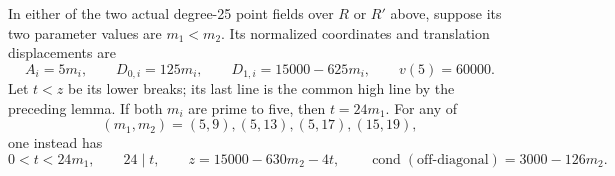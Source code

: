 \begin{lemma}
\label{lem:B-RD94-common-high}
In either of the two actual degree-25 point fields over $R$ or
$R'$ above, suppose its two parameter values are $m_1<m_2$.
Its normalized coordinates and translation displacements are
\[
 A_i=5m_i,\qquad D_{0,i}=125m_i,\qquad
 D_{1,i}=15000-625m_i,\qquad v(5)=60000.             \tag{B-RD94.9}
\]
Let $t<z$ be its lower breaks; its last line is the common high
line by the preceding lemma.
If both $m_i$ are prime to five, then $t=24m_1$.
For any of
\[
                 (m_1,m_2)=(5,9),(5,13),(5,17),(15,19),
                                                        \tag{B-RD94.10}
\]
one instead has
\[
 0<t<24m_1,\qquad24\mid t,\qquad
 z=15000-630m_2-4t,\qquad
 \operatorname{cond}(\text{off-diagonal})=3000-126m_2.
                                                        \tag{B-RD94.11}
\]
\end{lemma}
